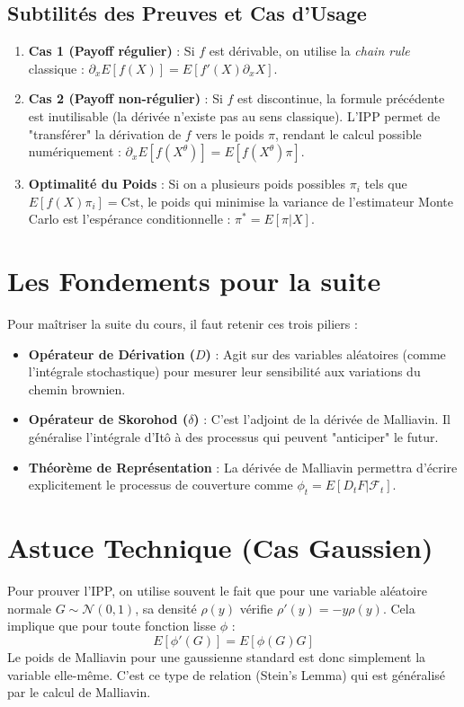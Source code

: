 \documentclass{article}
\begin{document}
\subsection{Subtilités des Preuves et Cas d'Usage}
\begin{enumerate}
    \item \textbf{Cas 1 (Payoff régulier)} : Si $f$ est dérivable, on utilise la \textit{chain rule} classique : $\partial_x E[f(X)] = E[f'(X) \partial_x X]$.
    \item \textbf{Cas 2 (Payoff non-régulier)} : Si $f$ est discontinue, la formule précédente est inutilisable (la dérivée n'existe pas au sens classique). L'IPP permet de "transférer" la dérivation de $f$ vers le poids $\pi$, rendant le calcul possible numériquement : $\partial_x E[f(X^\theta)] = E[f(X^\theta) \pi]$.
    \item \textbf{Optimalité du Poids} : Si on a plusieurs poids possibles $\pi_i$ tels que $E[f(X) \pi_i] = \text{Cst}$, le poids qui minimise la variance de l'estimateur Monte Carlo est l'espérance conditionnelle : $\pi^* = E[\pi | X]$.
\end{enumerate}

\section{Les Fondements pour la suite}
Pour maîtriser la suite du cours, il faut retenir ces trois piliers :
\begin{itemize}
    \item \textbf{Opérateur de Dérivation ($D$)} : Agit sur des variables aléatoires (comme l'intégrale stochastique) pour mesurer leur sensibilité aux variations du chemin brownien.
    \item \textbf{Opérateur de Skorohod ($\delta$)} : C'est l'adjoint de la dérivée de Malliavin. Il généralise l'intégrale d'Itô à des processus qui peuvent "anticiper" le futur.
    \item \textbf{Théorème de Représentation} : La dérivée de Malliavin permettra d'écrire explicitement le processus de couverture comme $\phi_t = E[D_t F | \mathcal{F}_t]$.
\end{itemize}

\section{Astuce Technique (Cas Gaussien)}
Pour prouver l'IPP, on utilise souvent le fait que pour une variable aléatoire normale $G \sim \mathcal{N}(0,1)$, sa densité $\rho(y)$ vérifie $\rho'(y) = -y \rho(y)$.
Cela implique que pour toute fonction lisse $\phi$ :
\[
E[\phi'(G)] = E[\phi(G) G]
\]
Le poids de Malliavin pour une gaussienne standard est donc simplement la variable elle-même. C'est ce type de relation (Stein's Lemma) qui est généralisé par le calcul de Malliavin.
\end{document}
